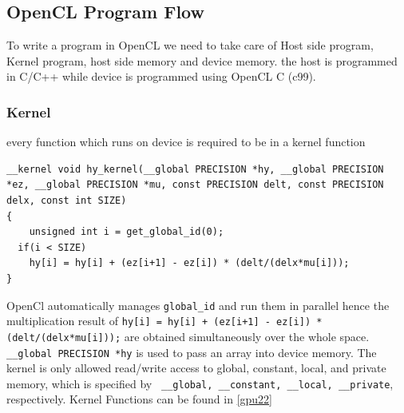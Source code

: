 \subsection {OpenCL Program Flow}
To write a program in OpenCL we need to take care of Host side program, Kernel program, host side memory and device memory. the host is programmed in C/C++ while device is programmed using OpenCL C (c99).

\subsubsection{Kernel}
every function which runs on device is required to be in a kernel function

\lstset{language=C,caption=OpenCL Kernel function, label=kernel}
\begin{lstlisting}
__kernel void hy_kernel(__global PRECISION *hy, __global PRECISION *ez, __global PRECISION *mu, const PRECISION delt, const PRECISION delx, const int SIZE) 
{
	unsigned int i = get_global_id(0);
  if(i < SIZE)
    hy[i] = hy[i] + (ez[i+1] - ez[i]) * (delt/(delx*mu[i]));
}
\end{lstlisting}
OpenCl automatically manages \lstinline{global_id} and run them in parallel hence the multiplication result of  \lstinline{hy[i] = hy[i] + (ez[i+1] - ez[i]) * (delt/(delx*mu[i]));} are obtained simultaneously over the whole space.
\lstinline{__global PRECISION *hy} is used to pass an array into device memory. The kernel is only allowed read/write access to global, constant, local, and private memory, which is specified by \lstinline{ __global, __constant, __local, __private}, respectively. Kernel Functions can be found in \ref{gpu22}

